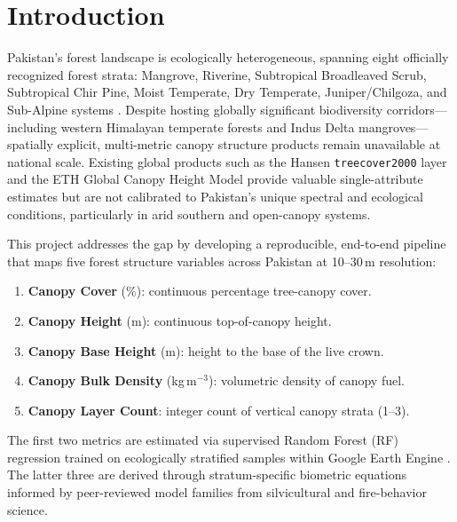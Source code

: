 \documentclass[12pt,a4paper,twoside]{article}
\begin{document}
\newpage
\tableofcontents
\newpage

\section{Introduction}\label{sec:intro}

Pakistan's forest landscape is ecologically heterogeneous, spanning eight officially
recognized forest strata: Mangrove, Riverine, Subtropical Broadleaved Scrub,
Subtropical Chir Pine, Moist Temperate, Dry Temperate, Juniper/Chilgoza, and
Sub-Alpine systems \citep{PakistanFREL2020}.  Despite hosting globally significant
biodiversity corridors---including western Himalayan temperate forests and Indus Delta
mangroves---spatially explicit, multi-metric canopy structure products remain
unavailable at national scale.  Existing global products such as the Hansen
\texttt{treecover2000} layer \citep{Hansen2013} and the ETH Global Canopy Height
Model \citep{Lang2023} provide valuable single-attribute estimates but are not
calibrated to Pakistan's unique spectral and ecological conditions, particularly in
arid southern and open-canopy systems.

This project addresses the gap by developing a reproducible, end-to-end pipeline
that maps five forest structure variables across Pakistan at 10--30\,m resolution:

\begin{enumerate}[leftmargin=2em]
  \item \textbf{Canopy Cover} (\%): continuous percentage tree-canopy cover.
  \item \textbf{Canopy Height} (m): continuous top-of-canopy height.
  \item \textbf{Canopy Base Height} (m): height to the base of the live crown.
  \item \textbf{Canopy Bulk Density} (kg\,m$^{-3}$): volumetric density of canopy fuel.
  \item \textbf{Canopy Layer Count}: integer count of vertical canopy strata (1--3).
\end{enumerate}

The first two metrics are estimated via supervised Random Forest (RF) regression
\citep{Breiman2001} trained on ecologically stratified samples within Google Earth
Engine \citep{Gorelick2017}.  The latter three are derived through stratum-specific
biometric equations informed by peer-reviewed model families from silvicultural and
fire-behavior science.
\end{document}
